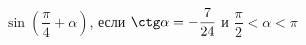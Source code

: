 \begin{ex}[type=simplify_calculate]
	\begin{condition}
		\( \sin\left( \dfrac{\pi}{4}+\alpha \right) \), \quad если \( \ctg\alpha=-\dfrac{7}{24} \) и \( \dfrac{\pi}{2}<\alpha<\pi \)
	\end{condition}
\end{ex}